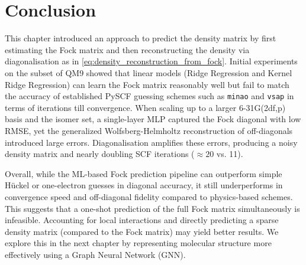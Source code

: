 \section{Conclusion}
\label{sec:fock_matrix_prediction_conclusion}
This chapter introduced an approach to predict the density matrix by first estimating the Fock matrix and then reconstructing the density via diagonalisation as in \autoref{eq:density_reconstruction_from_fock}. Initial experiments on the  subset of QM9 showed that linear models (Ridge Regression and Kernel Ridge Regression) can learn the Fock matrix reasonably well but fail to match the accuracy of established PySCF guessing schemes such as \texttt{minao} and \texttt{vsap} in terms of iterations till convergence. When scaling up to a larger 6-31G(2df,p) basis and the  isomer set, a single-layer MLP captured the Fock diagonal with low RMSE, yet the generalized Wolfsberg-Helmholtz reconstruction of off-diagonals introduced large errors. Diagonalisation amplifies these errors, producing a noisy density matrix and nearly doubling SCF iterations ($\approx20$ vs. 11).

Overall, while the ML-based Fock prediction pipeline can outperform simple Hückel or one-electron guesses in diagonal accuracy, it still underperforms in convergence speed and off-diagonal fidelity compared to physics-based schemes. This suggests that a one-shot prediction of the full Fock matrix simultaneously is infeasible. Accounting for local interactions and directly predicting a sparse density matrix (compared to the Fock matrix) may yield better results. We explore this in the next chapter by representing molecular structure more effectively using a Graph Neural Network (GNN). 

